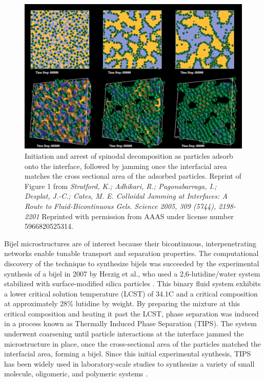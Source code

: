 \begin{figure}
    \centering
    \includegraphics[scale = 0.3]{figures/introduction/bijel_coarsening.jpg}
    \caption{Initiation and arrest of spinodal decomposition as particles adsorb onto the interface, followed by jamming once the 
            interfacial area matches the cross sectional area of the adsorbed particles. Reprint of Figure 1 from
            \textit{Stratford, K.; Adhikari, R.; Pagonabarraga, I.; Desplat, J.-C.; Cates, M. E. Colloidal Jamming at Interfaces: A Route to Fluid-Bicontinuous Gels. Science 2005, 309 (5744), 2198-2201}
            Reprinted with permission from AAAS under license number 5966820525314.}
    \label{fig:bijel_coarsen}
\end{figure}

Bijel microstructures are of interest because their bicontinuous, interpenetrating networks enable tunable transport and separation properties. The computational discovery of the technique to 
synthesize bijels was succeeded by the experimental synthesis of a bijel in 2007 by Herzig et al., who used a 2,6-lutidine/water system stabilized with surface-modified silica particles
\cite{herzig_bicontinuous_2007}.
This binary fluid system exhibits a lower critical solution temperature (LCST) of 34.1\textdegree C and a critical composition at approximately 28\% lutidine by weight. By preparing the mixture at this 
critical composition and heating it past the LCST, phase separation was induced in a process known as Thermally Induced Phase Separation (TIPS). The system underwent coarsening until particle
interactions at the interface jammed the microstructure in place, once the cross-sectional area of the particles matched the interfacial area, forming a bijel. Since this initial 
experimental synthesis, TIPS has been widely used in laboratory-scale studies to synthesize a variety of small molecule, oligomeric, and polymeric systems 
\cite{tavacoli_novel_2011, lee_bicontinuous_2010, bai_dynamics_2015, ching_rapid_2021}. 

